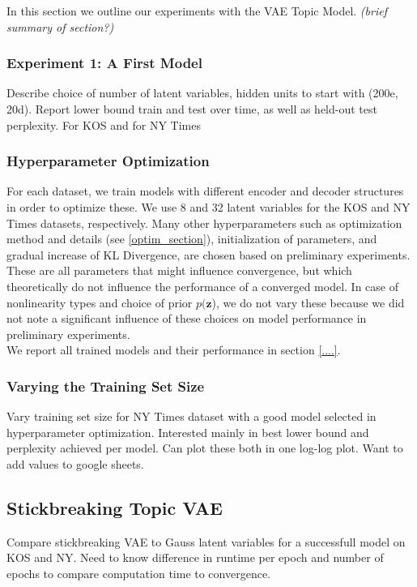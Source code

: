 \documentclass{report}
\begin{document}
	In this section we outline our experiments with the VAE Topic Model. \textit{(brief summary of section?)} 
	
	
	
	\subsubsection{Experiment 1: A First Model}
	Describe choice of number of latent variables, hidden units to start with (200e, 20d). Report lower bound train and test over time, as well as held-out test perplexity. For KOS and for NY Times
	
	\subsubsection{Hyperparameter Optimization}
	For each dataset, we train models with different encoder and decoder structures in order to optimize these. We use 8 and 32 latent variables for the KOS and NY Times datasets, respectively. Many other hyperparameters such as optimization method and details (see \ref{optim_section}), initialization of parameters, and gradual increase of KL Divergence, are chosen based on preliminary experiments. These are all parameters that might influence convergence, but which theoretically do not influence the performance of a converged model. In case of nonlinearity types and choice of prior $p(\mathbf{z}$), we do not vary these because we did not note a significant influence of these choices on model performance in preliminary experiments.\\
	We report all trained models and their performance in section \ref{....}.
	
	
	\subsubsection{Varying the Training Set Size}
	Vary training set size for NY Times dataset with a good model selected in hyperparameter optimization. Interested mainly in best lower bound and perplexity achieved per model. Can plot these both in one log-log plot. Want to add values to google sheets.
		
	\subsection{Stickbreaking Topic VAE}
	
	Compare stickbreaking VAE to Gauss latent variables for a successfull model on KOS and NY. Need to know difference in runtime per epoch and number of epochs to compare computation time to convergence.
	
\end{document}
